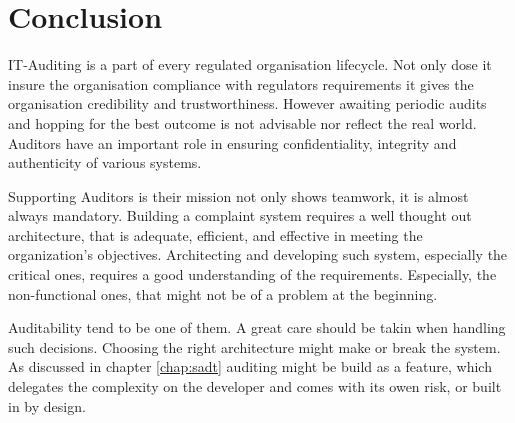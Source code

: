 %
\chapter{Conclusion}










IT-Auditing is a part of every regulated organisation lifecycle. Not only dose it insure the organisation compliance with regulators requirements it gives the organisation credibility and trustworthiness.  However awaiting periodic audits and hopping for the best outcome is not advisable nor reflect the real world. Auditors have an important role in ensuring confidentiality, integrity and authenticity of various systems.

Supporting Auditors is their mission not only shows teamwork, it is almost always mandatory. Building a complaint system requires a well thought out architecture, that is adequate, efficient, and effective in meeting the organization’s objectives. Architecting and developing such system, especially the critical ones, requires a good understanding of the requirements. Especially, the non-functional ones, that might not be of a problem at the beginning.

Auditability tend to be one of them. A great care should be takin when handling such decisions. Choosing the right architecture might make or break the system. As discussed in chapter \ref{chap:sadt} auditing might be build as a feature, which delegates the complexity on the developer and comes with its owen risk, or built in by design.

